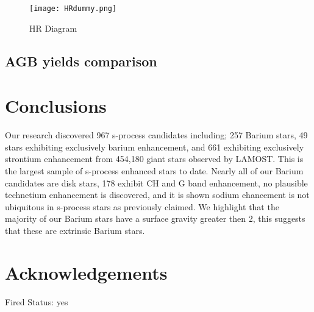 \documentclass[a4paper,fleqn,usenatbib]{mnras}
\begin{document}
\begin{figure}
	\texttt{[image: HRdummy.png]}
    \caption{HR Diagram}
    \label{fig:figure2}
\end{figure}


\subsection{AGB yields comparison}

\section{Conclusions} \label{sec:con}

Our research discovered 967 s-process candidates including; 257 Barium stars, 49 stars exhibiting exclusively barium enhancement, and 661 exhibiting exclusively strontium enhancement from 454,180 giant stars observed by LAMOST. This is the largest sample of s-process enhanced stars to date. Nearly all of our Barium candidates are disk stars, 178 exhibit CH and G band enhancement, no plausible technetium enhancement is discovered, and it is shown sodium ehancement is not ubiquitous in s-process stars as previously claimed. We highlight that the majority of our Barium stars have a surface gravity greater then 2, this suggests that these are extrinsic Barium stars.

\section*{Acknowledgements}

Fired Status: yes

 

\end{document}
